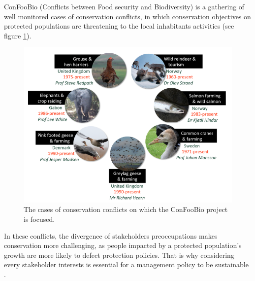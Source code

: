 \documentclass[12pt,a4paper]{article}
\begin{document}
ConFooBio (Conflicts between Food security and Biodiversity) is a gathering of well monitored cases of conservation conflicts, in which conservation objectives on protected populations are threatening to the local inhabitants activities (see figure \ref{confoobio}).
\begin{figure}
	\centering
	\includegraphics[scale=0.5]{confoobio-cases.png}
	\caption{The cases of conservation conflicts on which the ConFooBio project is focused.}
	\label{confoobio}
\end{figure}
In these conflicts, the divergence of stakeholders preoccupations makes conservation more challenging, as people impacted by a protected population's growth are more likely to defect protection policies.
That is why considering every stakeholder interests is essential for a management policy to be sustainable \citep{redpath2013understanding}.\\
\end{document}
